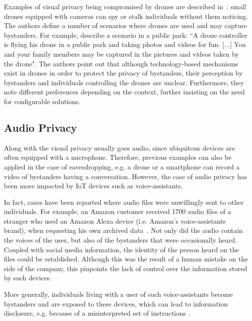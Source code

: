 \documentclass[conference]{IEEEtran}
\begin{document}
Examples of visual privacy being compromised by drones are described in~\cite{yao2017privacy}: small drones equipped with cameras can spy or stalk individuals without them noticing. The authors define a number of scenarios where drones are used and may capture bystanders. For example, describe a scenario in a public park: ``A drone controller is flying his drone in a public park and taking photos and videos for fun. [...] You and your family members may be captured in the pictures and videos taken by the drone". The authors point out that although technology-based mechanisms exist in drones in order to protect the privacy of bystanders, their perception by bystanders and individuals controlling the drones are unclear. Furthermore, they note different preferences depending on the context, further insisting on the need for configurable solutions.

\subsection{Audio Privacy}\label{Audio}
Along with the visual privacy usually goes audio, since ubiquitous devices are often equipped with a microphone. Therefore, previous examples can also be applied in the case of eavesdropping, e.g. a drone or a smartphone can record a video of bystanders having a conversation. However, the case of audio privacy has been more impacted by \ac{IoT} devices such as voice-assistants. 

In fact, cases have been reported where audio files were unwillingly sent to other individuals. For example, an Amazon customer received 1700 audio files of a stranger who used an Amazon Alexa device (i.e. Amazon's voice-assistants brand), when requesting his own archived data~\cite{huffpost2018amazon}. Not only did the audio contain the voices of the user, but also of the bystanders that were occasionally heard. Coupled with social media information, the identity of the person heard on the files could be established. Although this was the result of a human mistake on the side of the company, this pinpoints the lack of control over the information stored by such devices. 

More generally, individuals living with a user of such voice-assistants become bystanders and are exposed to these devices, which can lead to information disclosure, e.g. because of a misinterpreted set of instructions \cite{huffpost2018amazon}. 
\end{document}
